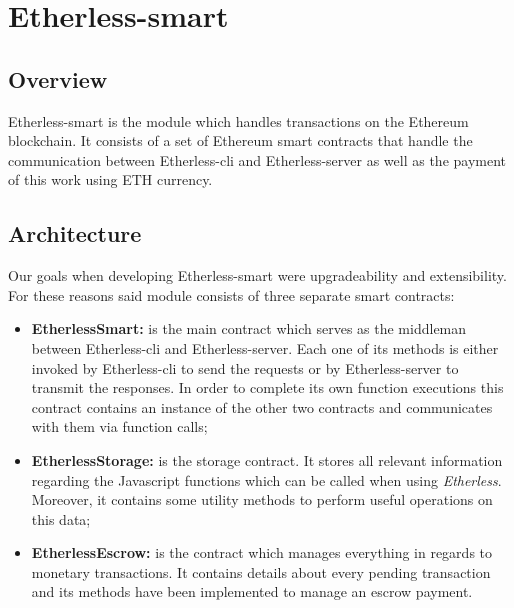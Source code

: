 \section{Etherless-smart}

\subsection{Overview}
	Etherless-smart is the module which handles transactions on the Ethereum blockchain. It consists of a set of Ethereum smart contracts that handle the communication between Etherless-cli and Etherless-server as well as the payment of this work using ETH currency.

\subsection{Architecture} %
		Our goals when developing Etherless-smart were upgradeability and extensibility. For these reasons said module consists of three separate smart contracts:
		\begin{itemize}
			\item \textbf{EtherlessSmart:} is the main contract which serves as the middleman between Etherless-cli and Etherless-server. Each one of its methods is either invoked by Etherless-cli to send the requests or by Etherless-server to transmit the responses. In order to complete its own function executions this contract contains an instance of the other two contracts and communicates with them via function calls;
			\item \textbf{EtherlessStorage:} is the storage contract. It stores all relevant information regarding the Javascript functions which can be called when using \textit{Etherless}. Moreover, it contains some utility methods to perform useful operations on this data;
			\item \textbf{EtherlessEscrow:} is the contract which manages everything in regards to monetary transactions. It contains details about every pending transaction and its methods have been implemented to manage an escrow payment.
		\end{itemize}

